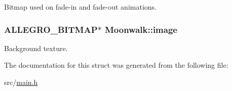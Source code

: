 \-Bitmap used on fade-\/in and fade-\/out animations. \hypertarget{structMoonwalk_a99f8ce8d3a4a8c3faca18b7c36eccdca}{
\subsubsection[{image}]{\setlength{\rightskip}{0pt plus 5cm}\-A\-L\-L\-E\-G\-R\-O\-\_\-\-B\-I\-T\-M\-A\-P$\ast$ {\bf \-Moonwalk\-::image}}}\label{structMoonwalk_a99f8ce8d3a4a8c3faca18b7c36eccdca}
\-Background texture. 

\-The documentation for this struct was generated from the following file\-:\begin{DoxyCompactItemize}
\item 
src/\hyperlink{main_8h}{main.\-h}\end{DoxyCompactItemize}
